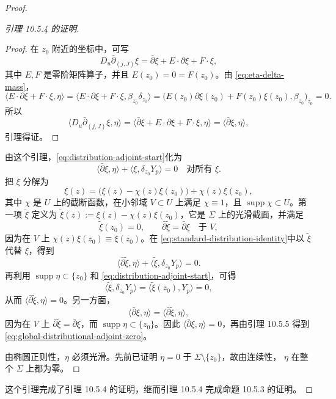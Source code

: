 \begin{proof}
\begin{proof}[引理 10.5.4 的证明]
\begin{proof}
在 $z_0$ 附近的坐标中，可写
\[
 D_u\bar\partial_{(j,J)}\xi
 =\bar\partial\xi+E\cdot\partial\xi+F\cdot\xi,
\]
其中 $E,F$ 是零阶矩阵算子，并且 $E(z_0)=0=F(z_0)$。由
\eqref{eq:eta-delta-mass}，
\[
 \langle E\cdot\partial\xi+F\cdot\xi,\eta\rangle
 =\langle E\cdot\partial\xi+F\cdot\xi,
 \beta_{z_0}\delta_{z_0}\rangle
 =\bigl(E(z_0)\partial\xi(z_0)+F(z_0)\xi(z_0),\beta_{z_0}\bigr)_{z_0}=0.
\]
所以
\[
 \langle D_u\bar\partial_{(j,J)}\xi,\eta\rangle
 =\langle\bar\partial\xi+E\cdot\partial\xi+F\cdot\xi,\eta\rangle
 =\langle\bar\partial\xi,\eta\rangle,
\]
引理得证。
\end{proof}

由这个引理，\eqref{eq:distribution-adjoint-start}化为
\begin{equation}
 \langle\bar\partial\xi,\eta\rangle
 +\langle\xi,\delta_{z_0}Y_p\rangle=0
 \quad\text{对所有 }\xi.
 \label{eq:standard-distribution-identity}
\end{equation}
把 $\xi$ 分解为
\[
 \xi(z)=\bigl(\xi(z)-\chi(z)\xi(z_0)\bigr)+\chi(z)\xi(z_0),
\]
其中 $\chi$ 是 $U$ 上的截断函数，在小邻域 $V\subset U$ 上满足
$\chi\equiv1$，且 $\operatorname{supp}\chi\subset U$。第一项
$\widetilde\xi$ 定义为
$\widetilde\xi(z):=\xi(z)-\chi(z)\xi(z_0)$，它是 $\Sigma$ 上的光滑截面，并满足
\[
 \widetilde\xi(z_0)=0,
 \qquad \bar\partial\widetilde\xi=\bar\partial\xi
 \quad\text{于 }V,
\]
因为在 $V$ 上 $\chi(z)\xi(z_0)\equiv\xi(z_0)$。在
\eqref{eq:standard-distribution-identity}中以 $\widetilde\xi$ 代替 $\xi$，得到
\[
 \langle\bar\partial\widetilde\xi,\eta\rangle
 +\langle\widetilde\xi,\delta_{z_0}Y_p\rangle=0.
\]
再利用 $\operatorname{supp}\eta\subset\{z_0\}$ 和
\eqref{eq:distribution-adjoint-start}，可得
\begin{equation}
 \langle\widetilde\xi,\delta_{z_0}Y_p\rangle
 =\langle\widetilde\xi(z_0),Y_p\rangle=0,
 \label{eq:cutoff-evaluation-vanishes}
\end{equation}
从而 $\langle\bar\partial\widetilde\xi,\eta\rangle=0$。另一方面，
\begin{equation}
 \langle\bar\partial\xi,\eta\rangle
 =\langle\bar\partial\widetilde\xi,\eta\rangle,
 \label{eq:cutoff-pairings-equal}
\end{equation}
因为在 $V$ 上 $\bar\partial\widetilde\xi=\bar\partial\xi$，而
$\operatorname{supp}\eta\subset\{z_0\}$。因此
$\langle\bar\partial\xi,\eta\rangle=0$，再由引理 10.5.5 得到
\eqref{eq:global-distributional-adjoint-zero}。

由椭圆正则性，$\eta$ 必须光滑。先前已证明
$\eta=0$ 于 $\Sigma\setminus\{z_0\}$，故由连续性，
$\eta$ 在整个 $\Sigma$ 上都为零。
\end{proof}

这个引理完成了引理 10.5.4 的证明，继而引理 10.5.4 完成命题 10.5.3 的证明。
\end{proof}

